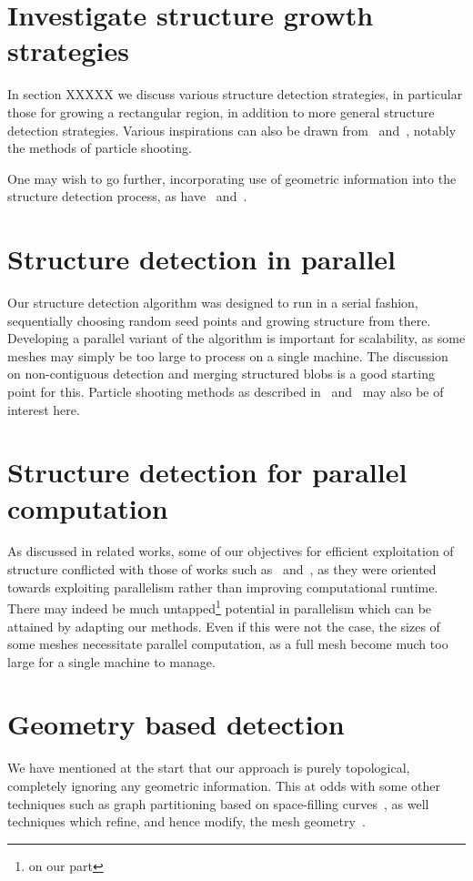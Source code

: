 \section{Investigate structure growth strategies}
In section XXXXX we discuss various structure detection strategies, in particular those for growing a rectangular region, in addition to more general structure detection strategies. Various inspirations can also be drawn from~\cite{eppstein2008motorcycle} and~\cite{eppstein2008approximate}, notably the methods of particle shooting.

One may wish to go further, incorporating use of geometric information into the structure detection process, as have~\cite{makem2012automatic} and~\cite{rocca2011fast}.


\section{Structure detection in parallel}
Our structure detection algorithm was designed to run in a serial fashion, sequentially choosing random seed points and growing structure from there. Developing a parallel variant of the algorithm is important for scalability, as some meshes may simply be too large to process on a single machine. The discussion on non-contiguous detection and merging structured blobs is a good starting point for this. Particle shooting methods as described in~\cite{eppstein2008motorcycle} and~\cite{eppstein2008approximate} may also be of interest here.



\section{Structure detection for parallel computation}
As discussed in related works, some of our objectives for efficient exploitation of structure conflicted with those of works such as~\cite{bergen2004hierarchical} and~\cite{li2004hierarchical}, as they were oriented towards exploiting parallelism rather than improving computational runtime. There may indeed be much untapped\footnote{on our part} potential in parallelism which can be attained by adapting our methods. Even if this were not the case, the sizes of some meshes necessitate parallel computation, as a full mesh become much too large for a single machine to manage.


\section{Geometry based detection}
We have mentioned at the start that our approach is purely topological, completely ignoring any geometric information. This at odds with some other techniques such as graph partitioning based on space-filling curves~\cite{ridley2010guide}, as well techniques which refine, and hence modify, the mesh geometry~\cite{bergen2004hierarchical}.

